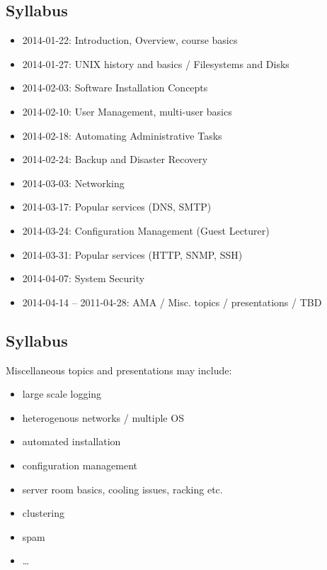 \documentclass[xga]{xdvislides}
\begin{document}
\subsection{Syllabus}
\begin{itemize}
	\item 2014-01-22: Introduction, Overview, course basics
	\item 2014-01-27: UNIX history and basics / Filesystems and Disks
	\item 2014-02-03: Software Installation Concepts
	\item 2014-02-10: User Management, multi-user basics
	\item 2014-02-18: Automating Administrative Tasks
	\item 2014-02-24: Backup and Disaster Recovery
	\item 2014-03-03: Networking
	\item 2014-03-17: Popular services (DNS, SMTP)
	\item 2014-03-24: Configuration Management (Guest Lecturer)
	\item 2014-03-31: Popular services (HTTP, SNMP, SSH)
	\item 2014-04-07: System Security
	\item 2014-04-14 -- 2011-04-28: AMA / Misc. topics / presentations / TBD
\end{itemize}

\subsection{Syllabus}
Miscellaneous topics and presentations may include:
\begin{itemize}
	\item large scale logging
	\item heterogenous networks / multiple OS
	\item automated installation
	\item configuration management
	\item server room basics, cooling issues, racking etc.
	\item clustering
	\item spam
	\item \ldots
\end{itemize}
\end{document}
